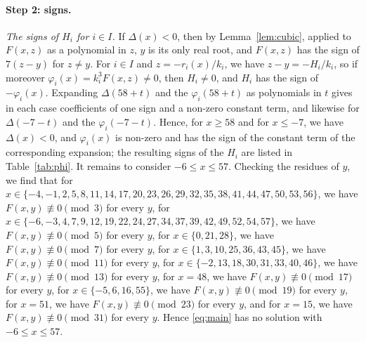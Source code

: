 \documentclass[11pt]{article}
\begin{document}
\paragraph{Step 2: signs.} \emph{The signs of $H_i$ for $i\in I$.} If $\Delta(x)<0$, then by Lemma~\ref{lem:cubic}, applied to $F(x,z)$ as a polynomial in $z$, $y$ is its only real root, and $F(x,z)$ has the sign of $7(z-y)$ for $z\neq y$. For $i\in I$ and $z=-r_i(x)/k_i$, we have $z-y=-H_i/k_i$, so if moreover $\varphi_i(x)=k_i^3F(x,z)\neq0$, then $H_i\neq0$, and $H_i$ has the sign of $-\varphi_i(x)$. Expanding $\Delta(58+t)$ and the $\varphi_i(58+t)$ as polynomials in $t$ gives in each case coefficients of one sign and a non-zero constant term, and likewise for $\Delta(-7-t)$ and the $\varphi_i(-7-t)$. Hence, for $x\geq58$ and for $x\leq-7$, we have $\Delta(x)<0$, and $\varphi_i(x)$ is non-zero and has the sign of the constant term of the corresponding expansion; the resulting signs of the $H_i$ are listed in Table~\ref{tab:phi}. It remains to consider $-6\leq x\leq57$. Checking the residues of $y$, we find that for $x\in\{-4,\allowbreak -1,\allowbreak 2,\allowbreak 5,\allowbreak 8,\allowbreak 11,\allowbreak 14,\allowbreak 17,\allowbreak 20,\allowbreak 23,\allowbreak 26,\allowbreak 29,\allowbreak 32,\allowbreak 35,\allowbreak 38,\allowbreak 41,\allowbreak 44,\allowbreak 47,\allowbreak 50,\allowbreak 53,\allowbreak 56\}$, we have $F(x,y)\not\equiv0\pmod{3}$ for every $y$, for $x\in\{-6,\allowbreak -3,\allowbreak 4,\allowbreak 7,\allowbreak 9,\allowbreak 12,\allowbreak 19,\allowbreak 22,\allowbreak 24,\allowbreak 27,\allowbreak 34,\allowbreak 37,\allowbreak 39,\allowbreak 42,\allowbreak 49,\allowbreak 52,\allowbreak 54,\allowbreak 57\}$, we have $F(x,y)\not\equiv0\pmod{5}$ for every $y$, for $x\in\{0,\allowbreak 21,\allowbreak 28\}$, we have $F(x,y)\not\equiv0\pmod{7}$ for every $y$, for $x\in\{1,\allowbreak 3,\allowbreak 10,\allowbreak 25,\allowbreak 36,\allowbreak 43,\allowbreak 45\}$, we have $F(x,y)\not\equiv0\pmod{11}$ for every $y$, for $x\in\{-2,\allowbreak 13,\allowbreak 18,\allowbreak 30,\allowbreak 31,\allowbreak 33,\allowbreak 40,\allowbreak 46\}$, we have $F(x,y)\not\equiv0\pmod{13}$ for every $y$, for $x=48$, we have $F(x,y)\not\equiv0\pmod{17}$ for every $y$, for $x\in\{-5,\allowbreak 6,\allowbreak 16,\allowbreak 55\}$, we have $F(x,y)\not\equiv0\pmod{19}$ for every $y$, for $x=51$, we have $F(x,y)\not\equiv0\pmod{23}$ for every $y$, and for $x=15$, we have $F(x,y)\not\equiv0\pmod{31}$ for every $y$. Hence \eqref{eq:main} has no solution with $-6\leq x\leq57$.
\end{document}
